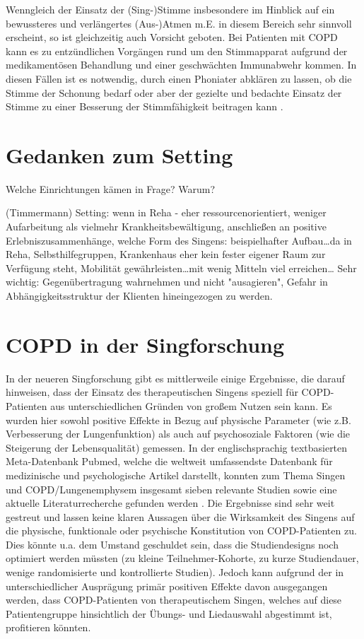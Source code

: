 Wenngleich der Einsatz der (Sing-)Stimme insbesondere im Hinblick auf ein bewussteres und verlängertes (Aus-)Atmen m.E. in diesem Bereich sehr sinnvoll erscheint, so ist gleichzeitig auch Vorsicht geboten. Bei Patienten mit COPD kann es zu entzündlichen Vorgängen rund um den Stimmapparat aufgrund der medikamentösen Behandlung und einer geschwächten Immunabwehr kommen. In diesen Fällen ist es notwendig, durch einen Phoniater abklären zu lassen, ob die Stimme der Schonung bedarf oder aber der gezielte und bedachte Einsatz der Stimme zu einer Besserung der Stimmfähigkeit beitragen kann \autocite[vgl.][103ff.]{alavi2009}.

\section{Gedanken zum Setting}
\label{section:gedanken_zum_setting}
Welche Einrichtungen kämen in Frage? Warum? 

(Timmermann) Setting: wenn in Reha - eher ressourcenorientiert, weniger Aufarbeitung als vielmehr Krankheitsbewältigung, anschließen an positive Erlebniszusammenhänge, welche Form des Singens: beispielhafter Aufbau\ldots da in Reha, Selbsthilfegruppen, Krankenhaus eher kein fester eigener Raum zur Verfügung steht, Mobilität gewährleisten\ldots mit wenig Mitteln viel erreichen…
Sehr wichtig: Gegenübertragung wahrnehmen und nicht "ausagieren", Gefahr in Abhängigkeitsstruktur der Klienten hineingezogen zu werden.

\section{COPD in der Singforschung}
\label{copd_in_der_singforschung}
In der neueren Singforschung gibt es mittlerweile einige Ergebnisse, die darauf hinweisen, dass der Einsatz des therapeutischen Singens speziell für COPD-Patienten aus unterschiedlichen Gründen von großem Nutzen sein kann. Es wurden hier sowohl positive Effekte in Bezug auf physische Parameter (wie z.B. Verbesserung der Lungenfunktion) als auch auf psychosoziale Faktoren (wie die Steigerung der Lebensqualität) gemessen.
In der englischsprachig textbasierten Meta-Datenbank Pubmed, welche die weltweit umfassendste Datenbank für medizinische und psychologische Artikel darstellt, konnten zum Thema Singen und COPD/Lungenemphysem insgesamt sieben relevante Studien sowie eine aktuelle Literaturrecherche gefunden werden \autocite{pmid19436683,pmid20175359,pmid20682030,pmid23145504,pmid23497924,pmid23497929,pmid24398814,pmid24793633}. Die Ergebnisse sind sehr weit gestreut und lassen keine klaren Aussagen über die Wirksamkeit des Singens auf die physische, funktionale oder psychische Konstitution von COPD-Patienten zu. Dies könnte u.a. dem Umstand geschuldet sein, dass die Studiendesigns noch optimiert werden müssten (zu kleine Teilnehmer-Kohorte, zu kurze Studiendauer, wenige randomisierte und kontrollierte Studien). Jedoch kann aufgrund der in unterschiedlicher Ausprägung primär positiven Effekte davon ausgegangen werden, dass COPD-Patienten von therapeutischem Singen, welches auf diese Patientengruppe hinsichtlich der Übungs- und Liedauswahl abgestimmt ist, profitieren könnten.

